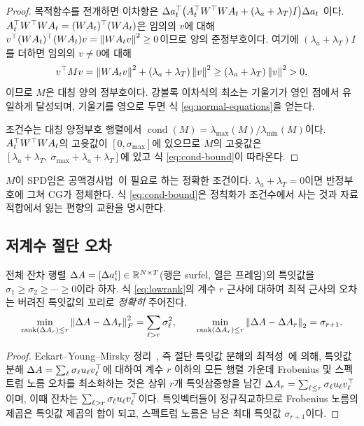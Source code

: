 \begin{proof}
목적함수를 전개하면 이차항은
$\Delta a_t^{\top}\bigl(A_t^{\top} W^{\top} W A_t + (\lambda_a+\lambda_T)I\bigr)\Delta a_t$
이다. $A_t^{\top} W^{\top} W A_t = (WA_t)^{\top}(WA_t)$은 임의의 $v$에 대해
$v^{\top}(WA_t)^{\top}(WA_t)v = \left\lVert WA_t v \right\rVert^2 \ge 0$이므로 양의 준정부호이다. 여기에
$(\lambda_a+\lambda_T)I$를 더하면 임의의 $v\ne0$에 대해
\[
  v^{\top} M v = \left\lVert WA_t v \right\rVert^2 + (\lambda_a+\lambda_T)\left\lVert v \right\rVert^2
  \ge (\lambda_a+\lambda_T)\left\lVert v \right\rVert^2 > 0,
\]
이므로 $M$은 대칭 양의 정부호이다. 강볼록 이차식의 최소는 기울기가 영인 점에서
유일하게 달성되며, 기울기를 영으로 두면 식 \eqref{eq:normal-equations}을 얻는다.

조건수는 대칭 양정부호 행렬에서
$\operatorname{cond}(M)=\lambda_{\max}(M)/\lambda_{\min}(M)$이다.
$A_t^{\top} W^{\top} W A_t$의 고윳값이 $[0,\sigma_{\max}]$에 있으므로 $M$의 고윳값은
$[\lambda_a+\lambda_T,\ \sigma_{\max}+\lambda_a+\lambda_T]$에 있고 식
\eqref{eq:cond-bound}이 따라온다.
\end{proof}

$M$이 SPD임은 공액경사법~\citep[제 5장]{nocedal2006_numerical}이 필요로 하는 정확한
조건이다.
$\lambda_a+\lambda_T=0$이면 반정부호에 그쳐 CG가 정체한다. 식 \eqref{eq:cond-bound}은
정칙화가 조건수에서 사는 것과 자료 적합에서 잃는 편향의 교환을 명시한다.

\subsection{저계수 절단 오차}

\begin{proposition}[저계수 절단 오차]
\label{prop:lowrank}
전체 잔차 행렬 $\Delta A = [\Delta a^t_i] \in \mathbb{R}^{N\times T}$(행은 surfel, 열은
프레임)의 특잇값을 $\sigma_1\ge\sigma_2\ge\cdots\ge0$이라 하자. 식 \eqref{eq:lowrank}의
계수 $r$ 근사에 대하여 최적 근사의 오차는 버려진 특잇값의 꼬리로 \emph{정확히}
주어진다.
\begin{equation}
  \min_{\operatorname{rank}(\Delta A_r)\le r}\left\lVert \Delta A - \Delta A_r \right\rVert_F^2
  = \sum_{\ell>r}\sigma_\ell^2,
  \qquad
  \min_{\operatorname{rank}(\Delta A_r)\le r}\left\lVert \Delta A - \Delta A_r \right\rVert_2 = \sigma_{r+1}.
  \label{eq:eckart-young}
\end{equation}
\end{proposition}

\begin{proof}
Eckart--Young--Mirsky 정리~\citep{eckart1936_approximation}, 즉 절단 특잇값 분해의
최적성~\citep[제 2.4절]{golub2013_matrix}에 의해, 특잇값 분해
$\Delta A = \sum_\ell \sigma_\ell u_\ell v_\ell^{\top}$에 대하여 계수 $r$ 이하의 모든
행렬 가운데 Frobenius 및 스펙트럼 노름 오차를 최소화하는 것은 상위 $r$개 특잇삼중항을
남긴 $\Delta A_r = \sum_{\ell\le r}\sigma_\ell u_\ell v_\ell^{\top}$이며, 이때 잔차는
$\sum_{\ell>r}\sigma_\ell u_\ell v_\ell^{\top}$이다. 특잇벡터들이 정규직교하므로
Frobenius 노름의 제곱은 특잇값 제곱의 합이 되고, 스펙트럼 노름은 남은 최대 특잇값
$\sigma_{r+1}$이다.
\end{proof}

